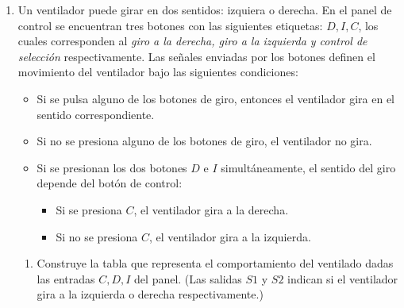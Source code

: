 \documentclass[11pt,letterpaper]{article}
\begin{document}
\begin{enumerate}
\begin{enumerate}
        \end{enumerate}

    \clearpage
    \item Un ventilador puede girar en dos sentidos: izquiera o derecha. En el panel de control
    se encuentran tres botones con las siguientes etiquetas: $D, I, C$, los cuales corresponden
    al \textit{giro a la derecha, giro a la izquierda y control de selección} respectivamente.
    Las señales enviadas por los botones definen el movimiento del ventilador bajo las siguientes
    condiciones:
        \begin{itemize}
            \item Si se pulsa alguno de los botones de giro, entonces el ventilador gira en el
            sentido correspondiente.
            \item Si no se presiona alguno de los botones de giro, el ventilador no gira.
            \item Si se presionan los dos botones $D$ e $I$ simultáneamente, el sentido del giro
            depende del botón de control:
                \begin{itemize}
                    \item Si se presiona $C$, el ventilador gira a la derecha.
                    \item Si no se presiona $C$, el ventilador gira a la izquierda.
                \end{itemize}
        \end{itemize}

        \begin{enumerate}
            \item Construye la tabla que representa el comportamiento del ventilado dadas
            las entradas $C, D, I$ del panel. (Las salidas $S1$ y $S2$ indican si el ventilador
            gira a la izquierda o derecha respectivamente.) \\


\end{enumerate}
\end{enumerate}
\end{document}
